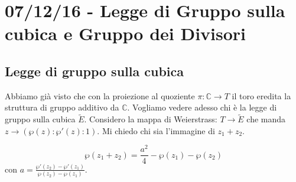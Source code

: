 \chapter{07/12/16 - Legge di Gruppo sulla cubica e Gruppo dei Divisori}
\justify

\section{Legge di gruppo sulla cubica}
Abbiamo già visto che con la proiezione al quoziente $\pi : \mathbb{C} \rightarrow T$ il toro eredita la struttura di gruppo additivo da $\mathbb{C}$.
Vogliamo vedere adesso chi è la legge di gruppo sulla cubica $\widetilde{E}$.
Considero la mappa di Weierstrass: $T\rightarrow \widetilde{E}$ che manda $z \rightarrow (\wp(z):\wp'(z):1)$. Mi chiedo chi sia l'immagine di $z_1 + z_2$.

\begin{teorema}
$$\wp(z_1+z_2)=\frac{a^2}{4}-\wp(z_1)-\wp(z_2)$$
con $a=\displaystyle{\frac{\wp'(z_2)-\wp'(z_1)}{\wp(z_2)-\wp(z_1)}}$.
\end{teorema}

